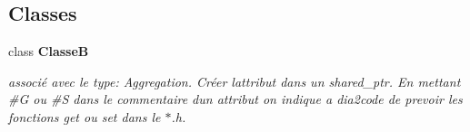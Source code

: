 \subsection*{Classes}
\begin{DoxyCompactItemize}
\item 
class {\bf Classe\+B}
\begin{DoxyCompactList}\small\item\em associé avec le type\+: \textquotesingle{}Aggregation\textquotesingle{}. Créer l\textquotesingle{}attribut dans un shared\+\_\+ptr. En mettant \#\+G ou \#\+S dans le commentaire d\textquotesingle{}un attribut on indique a dia2code de prevoir les fonctions get ou set dans le $\ast$.h. \end{DoxyCompactList}\end{DoxyCompactItemize}
